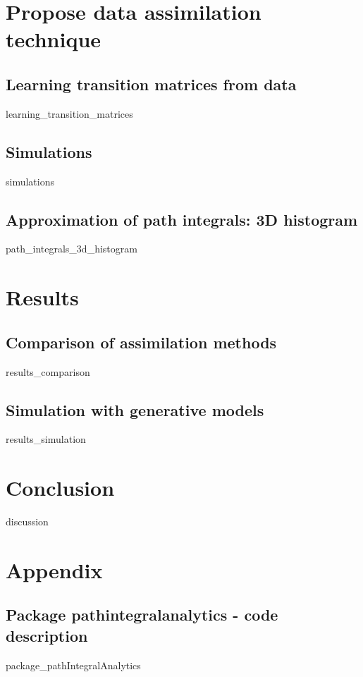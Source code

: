 \documentclass[10pt,a4paper]{report}
\begin{document}

\chapter{Propose data assimilation technique}

\section{Learning transition matrices from data}
	{learning_transition_matrices}

\section{Simulations}
	{simulations}

\section{Approximation of path integrals: 3D histogram}
	{path_integrals_3d_histogram}



\chapter{Results}

\section{Comparison of assimilation methods}
	{results_comparison}

\section{Simulation with generative models}
	{results_simulation}



\chapter{Conclusion}

	{discussion}



\chapter{Appendix}

\section{Package pathintegralanalytics - code description}
	{package_pathIntegralAnalytics}
\end{document}
